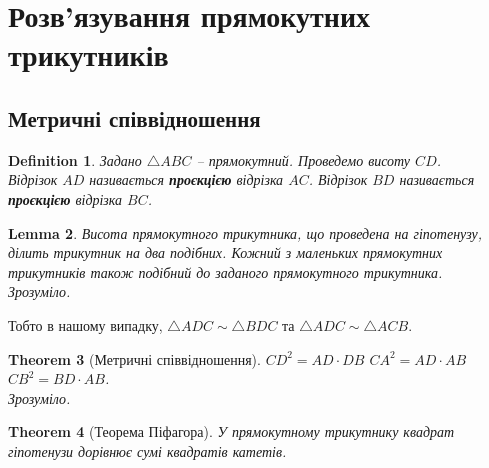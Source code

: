 \documentclass[a4paper, 10pt]{article}
\theoremstyle{theoremdd}
\newtheorem{theorem}{Theorem}[subsection]
\theoremstyle{theoremdd}
\theoremstyle{theoremdd}
\newtheorem{definition}[theorem]{Definition}
\theoremstyle{theoremdd}
\theoremstyle{theoremdd}
\theoremstyle{theoremdd}
\theoremstyle{theoremdd}
\theoremstyle{theoremdd}
\newtheorem{lemma}[theorem]{Lemma}
\theoremstyle{theoremdd}
\begin{document}
\newpage

\section{Розв'язування прямокутних трикутників}
\subsection{Метричні співвідношення}
\begin{definition}
Задано $\triangle ABC$ -- прямокутний. Проведемо висоту $CD$.\\
Відрізок $AD$ називається \textbf{проєкцією} відрізка $AC$. Відрізок $BD$ називається \textbf{проєкцією} відрізка $BC$.
\begin{figure}[H]
\centering
{}
\end{figure}
\end{definition}

\begin{lemma}
Висота прямокутного трикутника, що проведена на гіпотенузу, ділить трикутник на два подібних. Кожний з маленьких прямокутних трикутників також подібний до заданого прямокутного трикутника.\\
\textit{Зрозуміло.}
\end{lemma}
Тобто в нашому випадку, $\triangle ADC \sim \triangle BDC$ та $\triangle ADC \sim \triangle ACB$.

\begin{theorem}[Метричні співвідношення]
$CD^2 = AD \cdot DB$ \hspace{1cm} $CA^2 = AD \cdot AB$ \hspace{1cm} $CB^2 = BD \cdot AB$.\\
\textit{Зрозуміло.}
\end{theorem}

\begin{theorem}[Теорема Піфагора]
У прямокутному трикутнику квадрат гіпотенузи дорівнює сумі квадратів катетів.\\
\end{theorem}
\end{document}
